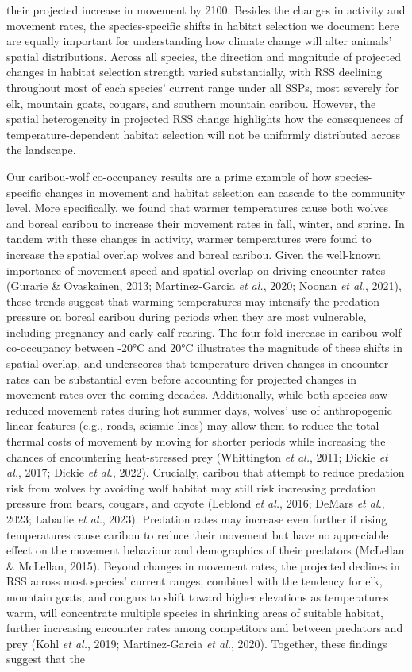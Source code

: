 \documentclass[
  12pt,
]{article}
\begin{document}
their projected increase in movement by 2100. Besides the changes in activity and movement rates, the species-specific shifts in habitat selection we document here are equally important for understanding how climate change will alter animals' spatial distributions. Across all species, the direction and magnitude of projected changes in habitat selection strength varied substantially, with RSS declining throughout most of each species' current range under all SSPs, most severely for elk, mountain goats, cougars, and southern mountain caribou. However, the spatial heterogeneity in projected RSS change highlights how the consequences of temperature-dependent habitat selection will not be uniformly distributed across the landscape.

Our caribou-wolf co-occupancy results are a prime example of how species-specific changes in movement and habitat selection can cascade to the community level. More specifically, we found that warmer temperatures cause both wolves and boreal caribou to increase their movement rates in fall, winter, and spring. In tandem with these changes in activity, warmer temperatures were found to increase the spatial overlap wolves and boreal caribou. Given the well-known importance of movement speed and spatial overlap on driving encounter rates (Gurarie \& Ovaskainen, 2013; Martinez-Garcia \emph{et al.}, 2020; {Noonan \emph{et al.}}, 2021), these trends suggest that warming temperatures may intensify the predation pressure on boreal caribou during periods when they are most vulnerable, including pregnancy and early calf-rearing. The four-fold increase in caribou-wolf co-occupancy between -20°C and 20°C illustrates the magnitude of these shifts in spatial overlap, and underscores that temperature-driven changes in encounter rates can be substantial even before accounting for projected changes in movement rates over the coming decades. Additionally, while both species saw reduced movement rates during hot summer days, wolves' use of anthropogenic linear features (e.g., roads, seismic lines) may allow them to reduce the total thermal costs of movement by moving for shorter periods while increasing the chances of encountering heat-stressed prey (Whittington \emph{et al.}, 2011; Dickie \emph{et al.}, 2017; Dickie \emph{et al.}, 2022). Crucially, caribou that attempt to reduce predation risk from wolves by avoiding wolf habitat may still risk increasing predation pressure from bears, cougars, and coyote (Leblond \emph{et al.}, 2016; DeMars \emph{et al.}, 2023; Labadie \emph{et al.}, 2023). Predation rates may increase even further if rising temperatures cause caribou to reduce their movement but have no appreciable effect on the movement behaviour and demographics of their predators (McLellan \& McLellan, 2015). Beyond changes in movement rates, the projected declines in RSS across most species' current ranges, combined with the tendency for elk, mountain goats, and cougars to shift toward higher elevations as temperatures warm, will concentrate multiple species in shrinking areas of suitable habitat, further increasing encounter rates among competitors and between predators and prey (Kohl \emph{et al.}, 2019; Martinez-Garcia \emph{et al.}, 2020). Together, these findings suggest that the 
\end{document}
